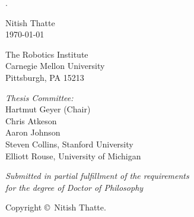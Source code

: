 \documentclass[]{tufte-book}
\begin{document}
\frontmatter

\begin{titlepage}
	\begin{fullwidth}
	\centering
    \phantom.
    \vspace{0.5in}
    {\huge{\thesistitle}\par}
    \vspace{0.5in}
    
    Nitish Thatte \\
    \today \\
    \vspace{0.9 in}
    
    The Robotics Institute \\
    Carnegie Mellon University \\
    Pittsburgh, PA 15213
    \vspace{0.9 in}
    
   	{\it Thesis Committee:}\\
    Hartmut Geyer (Chair)\\
    Chris Atkeson\\
    Aaron Johnson\\
    Steven Collins, Stanford University\\
    Elliott Rouse, University of Michigan\\
    \vspace{0.9 in}
   
   	{\it Submitted in partial fulfillment of the requirements\\ for the degree of Doctor of Philosophy}\\
    \vspace{0.9 in}
    
    Copyright \copyright \the\year \ Nitish Thatte.
 	\end{fullwidth}
\end{titlepage}

%

\tableofcontents

\listoffigures

\listoftables

\end{document}
